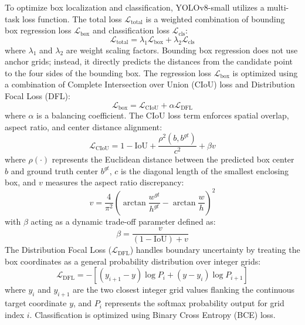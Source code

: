 \documentclass[conference]{IEEEtran}
\begin{document}
To optimize box localization and classification, YOLOv8-small utilizes a multi-task loss function. The total loss $\mathcal{L}_{\text{total}}$ is a weighted combination of bounding box regression loss $\mathcal{L}_{\text{box}}$ and classification loss $\mathcal{L}_{\text{cls}}$:
\begin{equation}
\mathcal{L}_{\text{total}} = \lambda_1 \mathcal{L}_{\text{box}} + \lambda_2 \mathcal{L}_{\text{cls}}
\label{eq:yolo_total}
\end{equation}
where $\lambda_1$ and $\lambda_2$ are weight scaling factors. Bounding box regression does not use anchor grids; instead, it directly predicts the distances from the candidate point to the four sides of the bounding box. The regression loss $\mathcal{L}_{\text{box}}$ is optimized using a combination of Complete Intersection over Union (CIoU) loss and Distribution Focal Loss (DFL):
\begin{equation}
\mathcal{L}_{\text{box}} = \mathcal{L}_{\text{CIoU}} + \alpha \mathcal{L}_{\text{DFL}}
\label{eq:yolo_box}
\end{equation}
where $\alpha$ is a balancing coefficient. The CIoU loss term enforces spatial overlap, aspect ratio, and center distance alignment:
\begin{equation}
\mathcal{L}_{\text{CIoU}} = 1 - \text{IoU} + \frac{\rho^2(b, b^{gt})}{c^2} + \beta v
\label{eq:ciou}
\end{equation}
where $\rho(\cdot)$ represents the Euclidean distance between the predicted box center $b$ and ground truth center $b^{gt}$, $c$ is the diagonal length of the smallest enclosing box, and $v$ measures the aspect ratio discrepancy:
\begin{equation}
v = \frac{4}{\pi^2} \left( \arctan\frac{w^{gt}}{h^{gt}} - \arctan\frac{w}{h} \right)^2
\label{eq:ciou_v}
\end{equation}
with $\beta$ acting as a dynamic trade-off parameter defined as:
\begin{equation}
\beta = \frac{v}{(1 - \text{IoU}) + v}
\label{eq:ciou_beta}
\end{equation}
The Distribution Focal Loss ($\mathcal{L}_{\text{DFL}}$) handles boundary uncertainty by treating the box coordinates as a general probability distribution over integer grids:
\begin{equation}
\mathcal{L}_{\text{DFL}} = - \left[ (y_{i+1} - y)\log P_i + (y - y_i)\log P_{i+1} \right]
\label{eq:dfl}
\end{equation}
where $y_i$ and $y_{i+1}$ are the two closest integer grid values flanking the continuous target coordinate $y$, and $P_i$ represents the softmax probability output for grid index $i$. Classification is optimized using Binary Cross Entropy (BCE) loss.
\end{document}
